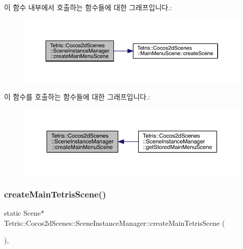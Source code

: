이 함수 내부에서 호출하는 함수들에 대한 그래프입니다.\+:
\nopagebreak
\begin{figure}[H]
\begin{center}
\leavevmode
\includegraphics[width=350pt]{class_tetris_1_1_cocos2d_scenes_1_1_scene_instance_manager_a7dad1373db969d5c882e2cdc46f7933a_cgraph}
\end{center}
\end{figure}
이 함수를 호출하는 함수들에 대한 그래프입니다.\+:
\nopagebreak
\begin{figure}[H]
\begin{center}
\leavevmode
\includegraphics[width=350pt]{class_tetris_1_1_cocos2d_scenes_1_1_scene_instance_manager_a7dad1373db969d5c882e2cdc46f7933a_icgraph}
\end{center}
\end{figure}
\mbox{\label{class_tetris_1_1_cocos2d_scenes_1_1_scene_instance_manager_a536188c1cdb7cb46ebd2edc8ebf1f17a}} 
\subsubsection{\texorpdfstring{create\+Main\+Tetris\+Scene()}{createMainTetrisScene()}}
{\footnotesize\ttfamily static Scene$\ast$ Tetris\+::\+Cocos2d\+Scenes\+::\+Scene\+Instance\+Manager\+::create\+Main\+Tetris\+Scene (\begin{DoxyParamCaption}{ }\end{DoxyParamCaption})\hspace{0.3cm}{\ttfamily [inline]}, {\ttfamily [static]}}

